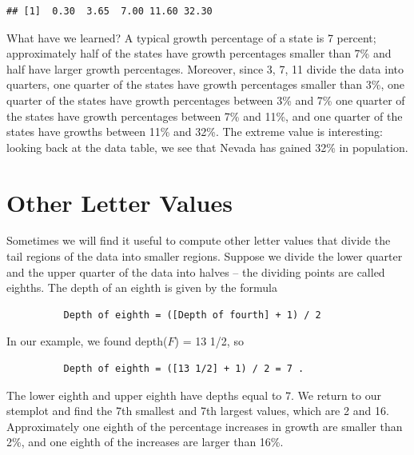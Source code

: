 \documentclass[
]{book}
\newenvironment{Shaded}{\begin{snugshade}}{\end{snugshade}}
\newcommand{\FunctionTok}[1]{\textcolor[rgb]{0.00,0.00,0.00}{#1}}
\newcommand{\NormalTok}[1]{#1}
\newcommand{\SpecialCharTok}[1]{\textcolor[rgb]{0.00,0.00,0.00}{#1}}
\begin{document}
\begin{Shaded}
\end{Shaded}

\begin{verbatim}
## [1]  0.30  3.65  7.00 11.60 32.30
\end{verbatim}

What have we learned? A typical growth percentage of a state is 7 percent; approximately half of the states have growth percentages smaller than 7\% and half have larger growth percentages. Moreover, since 3, 7, 11 divide the data into quarters, one quarter of the states have growth percentages smaller than 3\%, one quarter of the states have growth percentages between 3\% and 7\% one quarter of the states have growth percentages between 7\% and 11\%, and one quarter of the states have growths between 11\% and 32\%. The extreme value is interesting: looking back at the data table, we see that Nevada has gained 32\% in population.

\hypertarget{other-letter-values}{%
\section{Other Letter Values}\label{other-letter-values}}

Sometimes we will find it useful to compute other letter values that divide the tail regions of the data into smaller regions. Suppose we divide the lower quarter and the upper quarter of the data into halves -- the dividing points are called eighths. The depth of an eighth is given by the formula

\begin{verbatim}
          Depth of eighth = ([Depth of fourth] + 1) / 2
\end{verbatim}

In our example, we found depth(\(F\)) = 13 1/2, so

\begin{verbatim}
          Depth of eighth = ([13 1/2] + 1) / 2 = 7 .
\end{verbatim}

The lower eighth and upper eighth have depths equal to 7. We return to our stemplot and find the 7th smallest and 7th largest values, which are 2 and 16. Approximately one eighth of the percentage increases in growth are smaller than 2\%, and one eighth of the increases are larger than 16\%.
\end{document}
